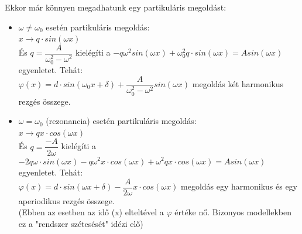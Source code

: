 \documentclass[margin=0px]{article}
\begin{document}
\begin{description}
					Ekkor már könnyen megadhatunk egy partikuláris megoldást:
					\begin{itemize}
						\item $\omega \neq \omega_0$ esetén partikuláris megoldás: \\
							$ x \rightarrow q\cdot sin(\omega x) $\\
							És $ q = \dfrac{A}{\omega_0^2-\omega^2} $ kielégíti a $-q\omega^2sin(\omega x)+\omega_0^2q\cdot sin(\omega x) = Asin(\omega x) $ egyenletet.
							Tehát: \\
							$ \varphi(x) = d\cdot sin(\omega_0x + \delta)+\dfrac{A}{\omega_0^2-\omega^2}sin(\omega x) $ megoldás két harmonikus rezgés összege.
						\item $ \omega = \omega_0 $ (rezonancia) esetén partikuláris megoldás: \\
							$ x \rightarrow qx\cdot cos(\omega x) $\\
							És $ q = \dfrac{-A}{2\omega} $ kielégíti a $-2q\omega \cdot sin(\omega x)- q\omega^2x\cdot cos(\omega x) +\omega^2qx\cdot cos(\omega x) = Asin(\omega x) $ egyenletet.
							Tehát: \\
							$ \varphi(x) = d\cdot sin(\omega x + \delta)-\dfrac{A}{2\omega}x\cdot cos(\omega x) $ megoldás egy harmonikus és egy aperiodikus rezgés összege.\\
							(Ebben az esetben az idő (x) elteltével a $\varphi $ értéke nő. Bizonyos modellekben ez a "rendszer szétesését" idézi elő)
					\end{itemize}
			\end{description}
\end{document}
